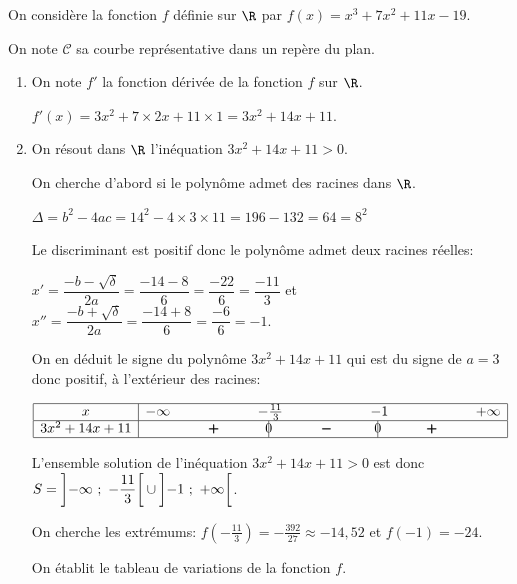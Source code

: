 \bigskip

On considère la fonction $f$ définie sur $\R$ par $f(x)=x^3 + 7x^2 +11x - 19$.

On note $\mathcal{C}$ sa courbe représentative dans un repère \Oij{} du plan.

\begin{enumerate}
\item On note $f'$ la fonction dérivée de la fonction $f$ sur $\R$. 

$f'(x) = 3x^2 +7\times 2x +11\times 1 = 3x^2+14x+11$.

\item On résout dans $\R$ l'inéquation $3x^2+14x+11 > 0$.

On cherche d'abord si le polynôme admet des racines dans $\R$.

$\Delta = b^2-4ac = 14^2 - 4\times 3 \times 11 = 196-132=64=8^2$

Le discriminant est positif donc le polynôme admet deux racines réelles:

$x'=\dfrac{-b-\sqrt{\delta}}{2a} = \dfrac{-14-8}{6} = \dfrac{-22}{6}=\dfrac{-11}{3}$
et
$x''=\dfrac{-b+\sqrt{\delta}}{2a} = \dfrac{-14+8}{6} = \dfrac{-6}{6}=-1$.

On en déduit le signe du polynôme $3x^2+14x+11$ qui est du signe de $a=3$ donc positif, à l'extérieur des racines:

\begin{center}
{
\renewcommand{\arraystretch}{1.5}
\def\esp{\hspace*{1.5cm}}
$\begin{array}{|c | *{7}{c} |} 
\hline
x  & -\infty & \esp & -\frac{11}{3} & \esp & -1 & \esp & +\infty \\
\hline
3x^2+14x+11 &  & \pmb{+} &  \vline\hspace{-2.7pt}{0} & \pmb{-} & \vline\hspace{-2.7pt}{0} & \pmb{+} &\\
\hline
\end{array}$
}
\end{center}

L'ensemble solution de l'inéquation $3x^2+14x+11 > 0$ est donc $S=\left ]-\infty~;~-\dfrac{11}{3} \right [ \cup \left ] -1~;~+\infty\vphantom{\dfrac{11}{3}} \right [$.

On cherche les extrémums:
$f\left ( -\frac{11}{3}\right )=-\frac{392}{27}\approx -14,52$ et $f(-1) = -24$.

On établit le tableau de variations de la fonction $f$.


\end{enumerate}
